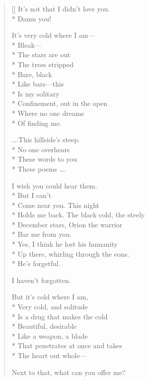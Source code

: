 \label{ch:blood_trail}
\settowidth{\versewidth}{Invisible and cold and silent.   I'll remain}
\begin{verse}[\versewidth]
It's not that I didn't love you.\\*
Damn you!

It's very cold where I am---\\*
Bleak---\\*
The stars are out\\*
The trees stripped\\*
Bare, black\\*
Like bars---this\\*
Is my solitary\\*
Confinement, out in the open\\*
Where no one dreams\\*
Of finding me.

\ldots .This hillside's steep.\\*
No one overhears\\*
These words to you\\*
These poems \ldots .

I wish you could hear them.\\*
But I can't\\*
Come near you.  This night\\*
Holds me back.   The black cold, the steely\\*
December stars, Orion the warrior\\*
Bar me from you.\\*
Yes, I think he lost his humanity\\*
Up there, whirling through the eons.\\*
He's forgetful.

I haven't forgotten.

But it's cold where I am,\\*
Very cold, and solitude\\*
Is a drug that makes the cold\\*
Beautiful, desirable\\*
Like a weapon, a blade\\*
That penetrates at once and takes\\*
The heart out whole---

Next to that, what can you offer me?


\end{verse}
